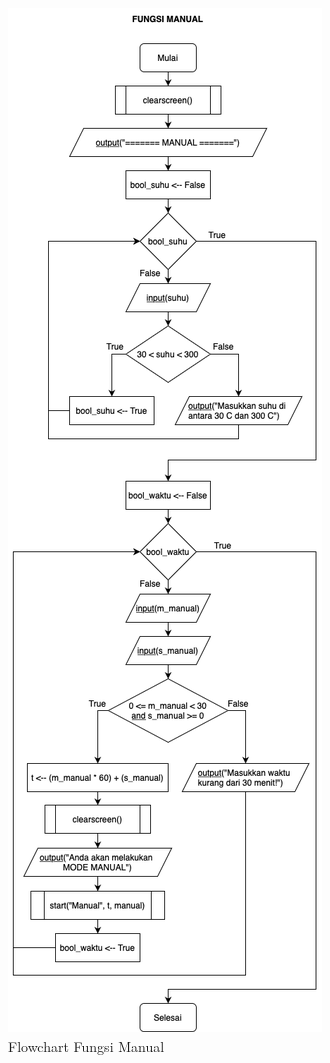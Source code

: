 \documentclass[conference]{IEEEtran}
\begin{document}
\begin{figure}[htbp]
    \centering
    \def\svgwidth{\columnwidth}
    \centerline{\includegraphics[scale=0.435]{Manual.png}}
    \caption{Flowchart Fungsi Manual}
    \label{fig7}
\end{figure}
\end{document}
